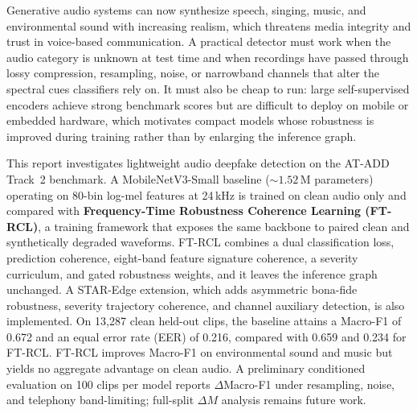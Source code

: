 Generative audio systems can now synthesize speech, singing, music, and environmental sound with increasing realism, which threatens media integrity and trust in voice-based communication. A practical detector must work when the audio category is unknown at test time and when recordings have passed through lossy compression, resampling, noise, or narrowband channels that alter the spectral cues classifiers rely on. It must also be cheap to run: large self-supervised encoders achieve strong benchmark scores but are difficult to deploy on mobile or embedded hardware, which motivates compact models whose robustness is improved during training rather than by enlarging the inference graph.

This report investigates lightweight audio deepfake detection on the AT-ADD Track~2 benchmark. A MobileNetV3-Small baseline (${\sim}1.52$\,M parameters) operating on 80-bin log-mel features at 24\,kHz is trained on clean audio only and compared with \textbf{Frequency-Time Robustness Coherence Learning (FT-RCL)}, a training framework that exposes the same backbone to paired clean and synthetically degraded waveforms. FT-RCL combines a dual classification loss, prediction coherence, eight-band feature signature coherence, a severity curriculum, and gated robustness weights, and it leaves the inference graph unchanged. A STAR-Edge extension, which adds asymmetric bona-fide robustness, severity trajectory coherence, and channel auxiliary detection, is also implemented. On 13{,}287 clean held-out clips, the baseline attains a Macro-F1 of 0.672 and an equal error rate (EER) of 0.216, compared with 0.659 and 0.234 for FT-RCL. FT-RCL improves Macro-F1 on environmental sound and music but yields no aggregate advantage on clean audio. A preliminary conditioned evaluation on 100 clips per model reports $\Delta$Macro-F1 under resampling, noise, and telephony band-limiting; full-split $\Delta M$ analysis remains future work.
